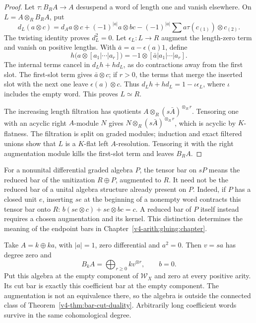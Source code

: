 \begin{proof}
Let \(\tau:B_RA\to A\) desuspend a word of length one and vanish
elsewhere. On \(L=A\otimes_R B_RA\), put
\[
 d_L(a\otimes c)=d_Aa\otimes c+(-1)^{|a|}a\otimes bc
      -(-1)^{|a|}\sum a\tau(c_{(1)})\otimes c_{(2)}.
\]
The twisting identity proves \(d_L^2=0\). Let
\(\epsilon_L:L\to R\) augment the length-zero term and vanish
on positive lengths. With \(\bar a=a-\epsilon(a)1\), define
\[
 h\bigl(a\otimes[ a_1|\cdots|a_r]\bigr)
       =-1\otimes[\bar a|a_1|\cdots|a_r].
\]
The internal terms cancel in \(d_Lh+hd_L\), as do contractions
away from the first slot. The first-slot term gives
\(\bar a\otimes c\); if \(r>0\), the terms that merge the
inserted slot with the next one leave \(\epsilon(a)\otimes c\).
Thus \(d_Lh+hd_L=1-\iota\epsilon_L\), where \(\iota\) includes
the empty word. This proves \(L\simeq R\).

The increasing length filtration has quotients
\(A\otimes_R(s\bar A)^{\otimes_R r}\). Tensoring one with an
acyclic right \(A\)-module \(N\) gives
\(N\otimes_R(s\bar A)^{\otimes_R r}\), which is acyclic by
\(K\)-flatness. The filtration is split on graded modules;
induction and exact filtered unions show that \(L\) is a
\(K\)-flat left \(A\)-resolution. Tensoring it with the right
augmentation module kills the first-slot term and leaves \(B_RA\).
\end{proof}

For a nonunital differential graded algebra \(P\), the tensor bar
on \(sP\) means the reduced bar of the unitization \(R\oplus P\),
augmented to \(R\). It need not be the reduced bar of a unital
algebra structure already present on \(P\). Indeed, if \(P\) has
a closed unit \(e\), inserting \(se\) at the beginning of a
nonempty word contracts this tensor bar onto \(R\):
\(b(se\otimes c)+se\otimes bc=c\). A reduced bar of \(P\)
itself instead requires a chosen augmentation and its kernel.
This distinction determines the meaning of the endpoint bars in
Chapter~\ref{v4-arith:gluing:chapter}.

\begin{example}
\label{v4-ex:bar-empty-infinite}
Take \(A=k\oplus ka\), with \(|a|=1\), zero differential and
\(a^2=0\). Then \(v=sa\) has degree zero and
\[
 B_kA=\bigoplus_{r\geq0}kv^{\otimes r},\qquad b=0.
\]
Put this algebra at the empty component of \(\mathcal W_X\)
and zero at every positive arity. Its cut bar is exactly this
coefficient bar at the empty component. The augmentation is not
an equivalence there, so the algebra is outside the connected
class of Theorem~\ref{v4-thm:bar-cut-duality}. Arbitrarily long
coefficient words survive in the same cohomological degree.
\end{example}

